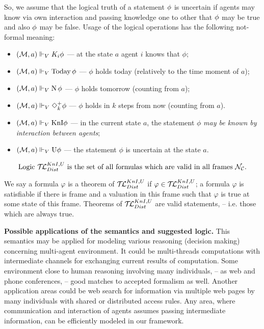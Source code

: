 \documentclass[runningheads]{llncs}
\begin{document}
So, we assume that the logical truth of a statement $\phi$ is uncertain if agents may know via
own interaction and passing knowledge one to other that $\phi$ may be true and also $\phi$ may be false.
Usage of the logical operations has the following not-formal meaning:
\begin{itemize}
    \item
\((\mathcal{M},a)\Vdash_V K_i \phi\)  --- at the state $a$
 agent $i$ knows that $\phi$;
  \medskip
    \item
\((\mathcal{M},a)\Vdash_V \mathrm{Today}\, \phi\)  ---
  $\phi$ holds today (relatively to the time moment of $a$);
  \medskip
    \item
\((\mathcal{M},a)\Vdash_V \mathrm{N}\, \phi\)  ---
  $\phi$ holds tomorrow (counting from $a$);
  \medskip
    \item
\((\mathcal{M},a)\Vdash_V \Diamond^+_k \phi\)  ---
  $\phi$ holds in $k$ steps from now (counting from  $a$).

  \item \vspace*{0.3cm}
$(\mathcal{M},a)\Vdash_V \mbox{KnI} \phi$ --- in the current state $a$, the statement
$\phi$ {\it may be
known by interaction between agents};
\item \vspace*{0.3cm}
$(\mathcal{M},a)\Vdash_V \mbox{U} \phi$ --- the statement $\phi$ is uncertain at the state $a$.
\end{itemize}

\begin{definition}
$$
\mbox{Logic $\mathcal{T\!L}^{KnI,U}_{Dist}$ is the set of all formulas
 which are valid in all frames $\mathcal{N_C}$.}
$$
\end{definition}

\medskip

We say a formula $\varphi$ is a theorem of $\mathcal{T\!L}^{KnI,U}_{Dist}$ if $ \varphi \in \mathcal{T\!L}^{KnI,U}_{Dist} $; a formula $\varphi$ is satisfiable if
there is frame and a valuation in this frame such that $\varphi$ is true at some state of this frame.
Theorems of $\mathcal{T\!L}^{KnI,U}_{Dist}$ are valid statements, -- i.e. those which are always true.

          \medskip



{\bf Possible applications of the semantics and suggested logic.}
This semantics may be applied for modeling various reasoning (decision making) concerning multi-agent environment.
It could be multi-threads  computations with intermediate channels for exchanging current results of computation.
Some environment close to human reasoning involving many individuals, -- as web and phone conferences, --
 good matches to accepted formalism as well. Another application areas could be web search for information via multiple web pages by
 many
individuals with shared or distributed access rules.
Any area, where communication and interaction of agents assumes passing intermediate information, can be efficiently modeled in our framework.
\end{document}
